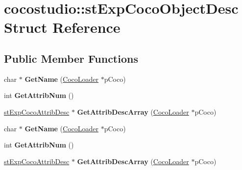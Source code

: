 \hypertarget{structcocostudio_1_1stExpCocoObjectDesc}{}\section{cocostudio\+:\+:st\+Exp\+Coco\+Object\+Desc Struct Reference}
\label{structcocostudio_1_1stExpCocoObjectDesc}
\subsection*{Public Member Functions}
\begin{DoxyCompactItemize}
\item 
\mbox{\label{structcocostudio_1_1stExpCocoObjectDesc_adb68beb99f379fb5d737f010062ab53a}} 
char $\ast$ {\bfseries Get\+Name} (\hyperlink{classcocostudio_1_1CocoLoader}{Coco\+Loader} $\ast$p\+Coco)
\item 
\mbox{\label{structcocostudio_1_1stExpCocoObjectDesc_a7595306e3c2e6ef255f66a7f50b68e97}} 
int {\bfseries Get\+Attrib\+Num} ()
\item 
\mbox{\label{structcocostudio_1_1stExpCocoObjectDesc_a4ee7e1ab2d9c9efadca84529c761edcf}} 
\hyperlink{structcocostudio_1_1stExpCocoAttribDesc}{st\+Exp\+Coco\+Attrib\+Desc} $\ast$ {\bfseries Get\+Attrib\+Desc\+Array} (\hyperlink{classcocostudio_1_1CocoLoader}{Coco\+Loader} $\ast$p\+Coco)
\item 
\mbox{\label{structcocostudio_1_1stExpCocoObjectDesc_a3823377d1238492c1d9518bb887bbee7}} 
char $\ast$ {\bfseries Get\+Name} (\hyperlink{classcocostudio_1_1CocoLoader}{Coco\+Loader} $\ast$p\+Coco)
\item 
\mbox{\label{structcocostudio_1_1stExpCocoObjectDesc_a7595306e3c2e6ef255f66a7f50b68e97}} 
int {\bfseries Get\+Attrib\+Num} ()
\item 
\mbox{\label{structcocostudio_1_1stExpCocoObjectDesc_ab0f4c88fa2a56d693bb415a68c9d1f73}} 
\hyperlink{structcocostudio_1_1stExpCocoAttribDesc}{st\+Exp\+Coco\+Attrib\+Desc} $\ast$ {\bfseries Get\+Attrib\+Desc\+Array} (\hyperlink{classcocostudio_1_1CocoLoader}{Coco\+Loader} $\ast$p\+Coco)
\end{DoxyCompactItemize}
